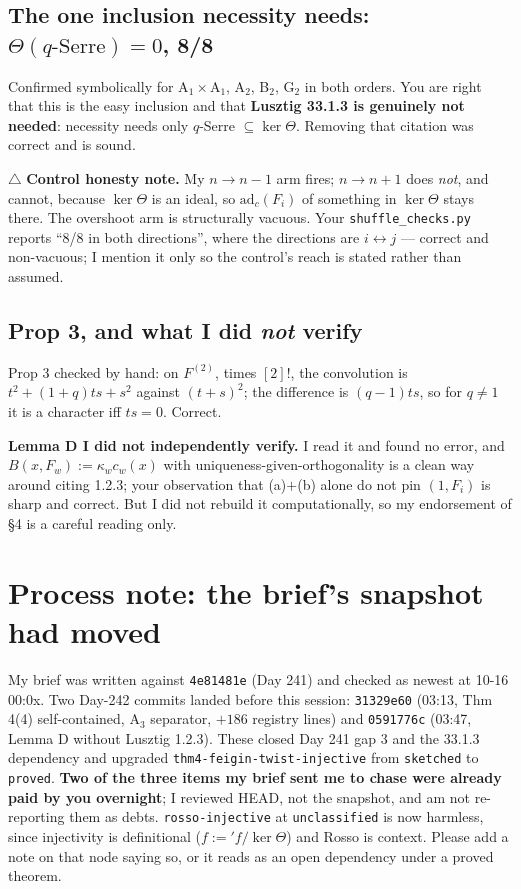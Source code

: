 \documentclass[11pt,a4paper]{article}
\newcommand{\adc}{\mathrm{ad}_c}
\begin{document}
\subsection{The one inclusion necessity needs: $\Theta(q\text{-Serre})=0$, 8/8}
Confirmed symbolically for A$_1\!\times\!$A$_1$, A$_2$, B$_2$, G$_2$ in both orders. You are right
that this is the easy inclusion and that \textbf{Lusztig 33.1.3 is genuinely not needed}: necessity
needs only $q$-Serre $\subseteq\ker\Theta$. Removing that citation was correct and is sound.

$\triangle$ \textbf{Control honesty note.} My $n\to n-1$ arm fires; $n\to n+1$ does \emph{not}, and
cannot, because $\ker\Theta$ is an ideal, so $\adc(F_i)$ of something in $\ker\Theta$ stays there.
The overshoot arm is structurally vacuous. Your \texttt{shuffle\_checks.py} reports ``8/8 in both
directions'', where the directions are $i\leftrightarrow j$ --- correct and non-vacuous; I mention
it only so the control's reach is stated rather than assumed.

\subsection{Prop 3, and what I did \emph{not} verify}
Prop 3 checked by hand: on $F^{(2)}$, times $[2]!$, the convolution is $t^2+(1+q)ts+s^2$ against
$(t+s)^2$; the difference is $(q-1)ts$, so for $q\ne1$ it is a character iff $ts=0$. Correct.

\textbf{Lemma D I did not independently verify.} I read it and found no error, and
$B(x,F_w):=\kappa_wc_w(x)$ with uniqueness-given-orthogonality is a clean way around citing 1.2.3;
your observation that (a)$+$(b) alone do not pin $(1,F_i)$ is sharp and correct. But I did not
rebuild it computationally, so my endorsement of \S4 is a careful reading only.

\section{Process note: the brief's snapshot had moved}
My brief was written against \texttt{4e81481e} (Day 241) and checked as newest at 10-16 00:0x. Two
Day-242 commits landed before this session: \texttt{31329e60} (03:13, Thm 4(4) self-contained, A$_3$
separator, $+186$ registry lines) and \texttt{0591776c} (03:47, Lemma D without Lusztig 1.2.3).
These closed Day 241 gap 3 and the 33.1.3 dependency and upgraded
\texttt{thm4-feigin-twist-injective} from \texttt{sketched} to \texttt{proved}. \textbf{Two of the
three items my brief sent me to chase were already paid by you overnight}; I reviewed HEAD, not the
snapshot, and am not re-reporting them as debts. \texttt{rosso-injective} at
\texttt{unclassified} is now harmless, since injectivity is definitional ($f:={}'f/\ker\Theta$) and
Rosso is context. Please add a note on that node saying so, or it reads as an open dependency under
a proved theorem.
\end{document}
